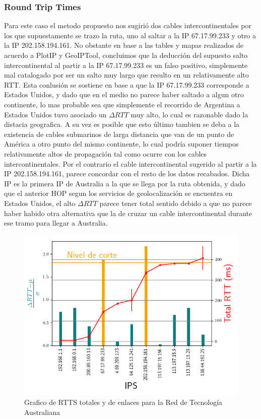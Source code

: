 \subsubsection{Round Trip Times}

Para este caso el metodo propuesto nos sugirió dos cables intercontinentales por los que supuestamente se trazo la ruta, uno al saltar a la IP 67.17.99.233 y otro a la IP 202.158.194.161. No obstante en base a las tables y mapas realizados de acuerdo a PlotIP y GeoIPTool, concluimos que la deducción del supuesto salto intercontinental al partir a la IP 67.17.99.233 es un falso positivo, simplemente mal catalogado por ser un salto muy largo que resulto en un relativamente alto RTT. Esta conlusión se sostiene en base a que la IP 67.17.99.233 corresponde a Estados Unidos, y dado que en el medio no parece haber saltado a algun otro continente, lo mas probable sea que simplemente el recorrido de Argentina a Estados Unidos tuvo asociado un $\Delta RTT$ muy alto, lo cual es razonable dado la distacia geografica. A su vez es posible que esto último tambien se deba a la existencia de cables submarinos de larga distancia que van de un punto de América a otro punto del mismo continente, lo cual podría suponer tiempos relativamente altos de propagación tal como ocurre con los cables intercontinentales. Por el contrario el cable intercontinental sugerido al partir a la IP 202.158.194.161, parece concordar con el resto de los datos recabados. Dicha IP es la primera IP de Australia a la que se llega por la ruta obtenida, y dado que el anterior HOP segun los servicios de geolocalización se encuentra en Estados Unidos, el alto $\Delta RTT$ parece tener total sentido debido a que no parece haber habido otra alternativa que la de cruzar un cable intercontinental durante ese tramo para llegar a Australia.

\begin{figure}[ht]\label{fig:rtts_tsu}
	\begin{center}
		\includegraphics[width=0.8\columnwidth]{imagenes/rtts_australia.png}
		\caption{Grafico de RTTS totales y de enlaces para la Red de Tecnología Australiana}
	\end{center}
\end{figure}

